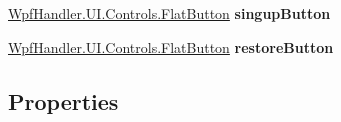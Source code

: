 \begin{DoxyCompactItemize}
\mbox{\label{class_wpf_handler_1_1_u_i_1_1_controls_1_1_logon_1_1_logon_panel_af3d23fd0eb5d334566ab21f3dbefb4ed}} 
\mbox{\hyperlink{class_wpf_handler_1_1_u_i_1_1_controls_1_1_flat_button}{Wpf\+Handler.\+U\+I.\+Controls.\+Flat\+Button}} {\bfseries singup\+Button}
\item 
\mbox{\label{class_wpf_handler_1_1_u_i_1_1_controls_1_1_logon_1_1_logon_panel_a5911bef87fc1c174057b446915cdf089}} 
\mbox{\hyperlink{class_wpf_handler_1_1_u_i_1_1_controls_1_1_flat_button}{Wpf\+Handler.\+U\+I.\+Controls.\+Flat\+Button}} {\bfseries restore\+Button}
\end{DoxyCompactItemize}
\subsection*{Properties}
